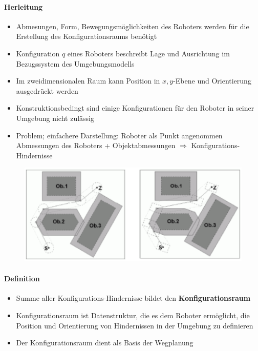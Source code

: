 \paragraph{Herleitung}
\begin{itemize}
	\item Abmesungen, Form, Bewegungsmöglichkeiten des Roboters werden für die Erstellung des Konfigurationsraums benötigt
	\item Konfiguration $q$ eines Roboters beschreibt Lage und Ausrichtung im Bezugssystem des Umgebungsmodells
	\item Im zweidimensionalen Raum kann Position in $x,y$-Ebene und Orientierung ausgedrückt werden
	\item Konstruktionsbedingt sind einige Konfigurationen für den Roboter in seiner Umgebung nicht zulässig
	\item Problem; einfachere Darstellung:
	\subitem Roboter als Punkt angenommen
	\subitem Abmessungen des Roboters + Objektabmessungen $\Rightarrow$ Konfigurations-Hindernisse
\end{itemize}
\begin{figure}[H]
	\begin{center}
		\includegraphics[scale=0.5]{Resources/PNG/Konfigurationshindernisse.PNG}
		\caption{}
		\label{fig:PNG/Konfigurationshindernisse.PNG}
	\end{center}
\end{figure}
\paragraph{Definition}
\begin{itemize}
	\item Summe aller Konfigurations-Hindernisse bildet den \textbf{Konfigurationsraum}
	\item Konfigurationsraum ist Datenstruktur, die es dem Roboter ermöglicht, die Position und Orientierung von Hindernissen in der Umgebung zu definieren
	\item Der Konfigurationsraum dient als Basis der Wegplanung
\end{itemize}
